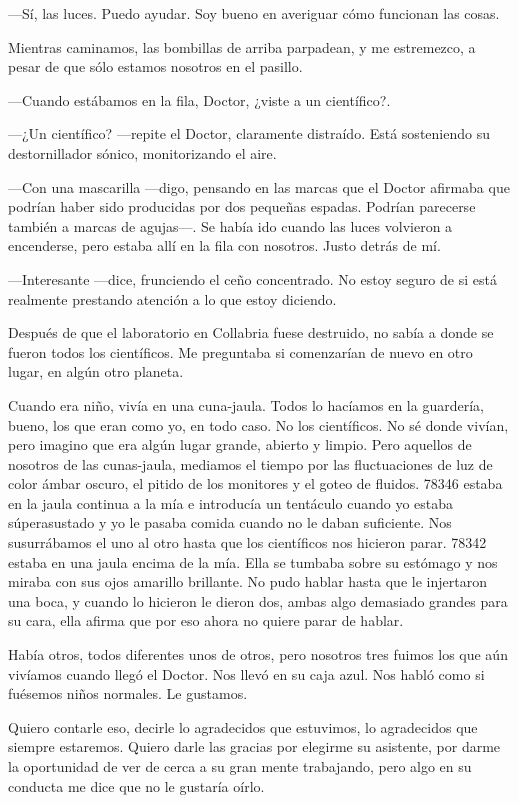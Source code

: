 ---Sí, las luces. Puedo ayudar. Soy bueno en averiguar cómo funcionan
las cosas.

Mientras caminamos, las bombillas de arriba parpadean, y me estremezco,
a pesar de que sólo estamos nosotros en el pasillo. 

---Cuando estábamos en la fila, Doctor, ¿viste a un científico?.

---¿Un científico? ---repite el Doctor, claramente distraído. Está
sosteniendo su destornillador sónico, monitorizando el aire.

---Con una mascarilla ---digo, pensando en las marcas que el Doctor
afirmaba que podrían haber sido producidas por dos pequeñas
espadas. Podrían parecerse también a marcas de agujas---. Se había ido
cuando las luces volvieron a encenderse, pero estaba allí en la fila con
nosotros. Justo detrás de mí.

---Interesante ---dice, frunciendo el ceño concentrado. No estoy seguro
de si está realmente prestando atención a lo que estoy diciendo.

Después de que el laboratorio en Collabria fuese destruido, no sabía a
donde se fueron todos los científicos. Me preguntaba si comenzarían de
nuevo en otro lugar, en algún otro planeta.

Cuando era niño, vivía en una cuna-jaula. Todos lo hacíamos en la
guardería, bueno, los que eran como yo, en todo caso. No los
científicos. No sé donde vivían, pero imagino que era algún lugar
grande, abierto y limpio. Pero aquellos de nosotros de las cunas-jaula,
mediamos el tiempo por las fluctuaciones de luz de color ámbar oscuro,
el pitido de los monitores y el goteo de fluidos. 78346 estaba en la
jaula continua a la mía e introducía un tentáculo cuando yo estaba
súperasustado y yo le pasaba comida cuando no le daban suficiente. Nos
susurrábamos el uno al otro hasta que los científicos nos hicieron
parar. 78342 estaba en una jaula encima de la mía. Ella se tumbaba sobre
su estómago y nos miraba con sus ojos amarillo brillante. No pudo hablar
hasta que le injertaron una boca, y cuando lo hicieron le dieron dos,
ambas algo demasiado grandes para su cara, ella afirma que por eso ahora
no quiere parar de hablar.

Había otros, todos diferentes unos de otros, pero nosotros tres fuimos
los que aún vivíamos cuando llegó el Doctor. Nos llevó en su caja
azul. Nos habló como si fuésemos niños normales. Le gustamos.

Quiero contarle eso, decirle lo agradecidos que estuvimos, lo
agradecidos que siempre estaremos. Quiero darle las gracias por elegirme
su asistente, por darme la oportunidad de ver de cerca a su gran mente
trabajando, pero algo en su conducta me dice que no le gustaría oírlo.

